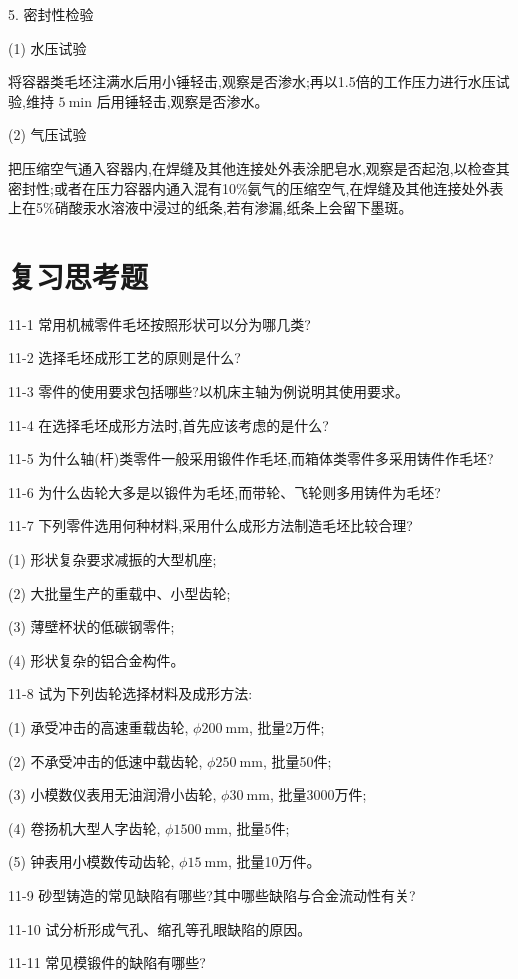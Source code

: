 \documentclass[UTF8]{ctexbook}
\newcommand{\◎}{\ensuremath{\bigcirc}}
\begin{document}
5. 密封性检验

(1) 水压试验

将容器类毛坯注满水后用小锤轻击,观察是否渗水;再以1.5倍的工作压力进行水压试验,维持 $5 \mathrm{~min}$ 后用锤轻击,观察是否渗水。

(2) 气压试验

把压缩空气通入容器内,在焊缝及其他连接处外表涂肥皂水,观察是否起泡,以检查其密封性;或者在压力容器内通入混有10\%氨气的压缩空气,在焊缝及其他连接处外表上在5\%硝酸汞水溶液中浸过的纸条,若有渗漏,纸条上会留下墨斑。

\section*{复习思考题}

 
11-1 常用机械零件毛坯按照形状可以分为哪几类?

11-2 选择毛坯成形工艺的原则是什么?

11-3 零件的使用要求包括哪些?以机床主轴为例说明其使用要求。

11-4 在选择毛坯成形方法时,首先应该考虑的是什么?

11-5 为什么轴(杆)类零件一般采用锻件作毛坯,而箱体类零件多采用铸件作毛坯?

11-6 为什么齿轮大多是以锻件为毛坯,而带轮、飞轮则多用铸件为毛坯?

11-7 下列零件选用何种材料,采用什么成形方法制造毛坯比较合理?

(1) 形状复杂要求减振的大型机座;

(2) 大批量生产的重载中、小型齿轮;

(3) 薄壁杯状的低碳钢零件;

(4) 形状复杂的铝合金构件。

11-8 试为下列齿轮选择材料及成形方法:

(1) 承受冲击的高速重载齿轮, $\phi 200 \mathrm{~mm}$, 批量2万件;

(2) 不承受冲击的低速中载齿轮, $\phi 250 \mathrm{~mm}$, 批量50件;

(3) 小模数仪表用无油润滑小齿轮, $\phi 30 \mathrm{~mm}$, 批量3000万件;

(4) 卷扬机大型人字齿轮, $\phi 1500 \mathrm{~mm}$, 批量5件;

(5) 钟表用小模数传动齿轮, $\phi 15 \mathrm{~mm}$, 批量10万件。

11-9 砂型铸造的常见缺陷有哪些?其中哪些缺陷与合金流动性有关?

11-10 试分析形成气孔、缩孔等孔眼缺陷的原因。

11-11 常见模锻件的缺陷有哪些?
\end{document}
